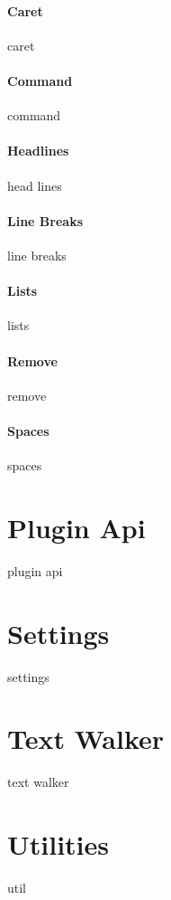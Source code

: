 \paragraph{Caret}
caret
\paragraph{Command}
command
\paragraph{Headlines}
head lines
\paragraph{Line Breaks}
line breaks
\paragraph{Lists}
lists
\paragraph{Remove}
remove
\paragraph{Spaces}
spaces

\section{Plugin Api}
plugin api
\section{Settings}
settings
\section{Text Walker}
text walker
\section{Utilities}
util